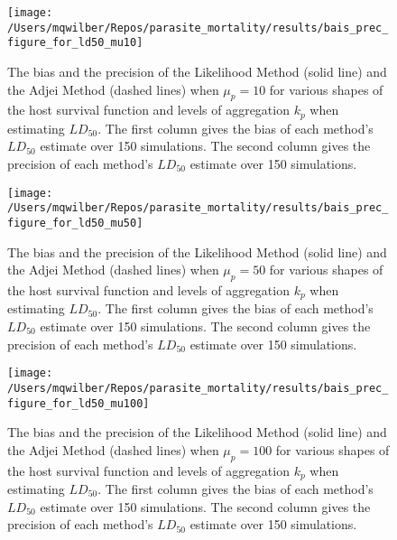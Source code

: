 \documentclass[12pt, a4paper]{article}
\begin{document}
\begin{figure}

    \texttt{[image: /Users/mqwilber/Repos/parasite\_mortality/results/bais\_prec\_figure\_for\_ld50\_mu10]}

    \caption{The bias and the precision of the Likelihood Method (solid line) and the Adjei Method (dashed lines) when $\mu_p = 10$ for various shapes of the host survival function and levels of aggregation $k_p$ when estimating $LD_{50}$.  The first column gives the bias of each method's $LD_{50}$ estimate over 150 simulations. The second column gives the precision of each method's $LD_{50}$ estimate over 150 simulations.}

    \label{fig:biasld50_10}

\end{figure}

\begin{figure}

    \texttt{[image: /Users/mqwilber/Repos/parasite\_mortality/results/bais\_prec\_figure\_for\_ld50\_mu50]}

    \caption{The bias and the precision of the Likelihood Method (solid line) and the Adjei Method (dashed lines) when $\mu_p = 50$ for various shapes of the host survival function and levels of aggregation $k_p$ when estimating $LD_{50}$.  The first column gives the bias of each method's $LD_{50}$ estimate over 150 simulations. The second column gives the precision of each method's $LD_{50}$ estimate over 150 simulations.}

    \label{fig:biasld50_50}

\end{figure}

\begin{figure}

    \texttt{[image: /Users/mqwilber/Repos/parasite\_mortality/results/bais\_prec\_figure\_for\_ld50\_mu100]}

    \caption{The bias and the precision of the Likelihood Method (solid line) and the Adjei Method (dashed lines) when $\mu_p = 100$ for various shapes of the host survival function and levels of aggregation $k_p$ when estimating $LD_{50}$.  The first column gives the bias of each method's $LD_{50}$ estimate over 150 simulations. The second column gives the precision of each method's $LD_{50}$ estimate over 150 simulations.}

    \label{fig:biasld50_100}

\end{figure}
\end{document}
